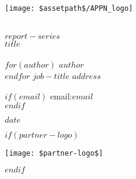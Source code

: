 

\thispagestyle{empty}  %
\vspace*{-18mm}  %

\begin{center}
    \texttt{[image: \$assetpath\$/APPN\_logo]}
\end{center}

\vspace{35mm}

\begin{flushright}
    \HRule\\[5mm]  %

    \Huge
    \textcolor{APPN}{\textsf{\textbf{$report-series$}}}\\[6mm]
    {\textsf{\textbf{$title$}}}\\

    \Large
    \\[5mm]

    \sf\normalsize
    $for(author)$
        \textsf{$author$}\\
    $endfor$
    $job-title$  %
    $address$    %
    \vspace*{0.4cm}

    $if(email)$
        email:\;$email$\\[8mm]
    $endif$

    $date$
    \HRule  %
\end{flushright}

\vfill  %

$if(partner-logo)$
    \begin{center}
        \texttt{[image: \$partner-logo\$]}
    \end{center}
$endif$

